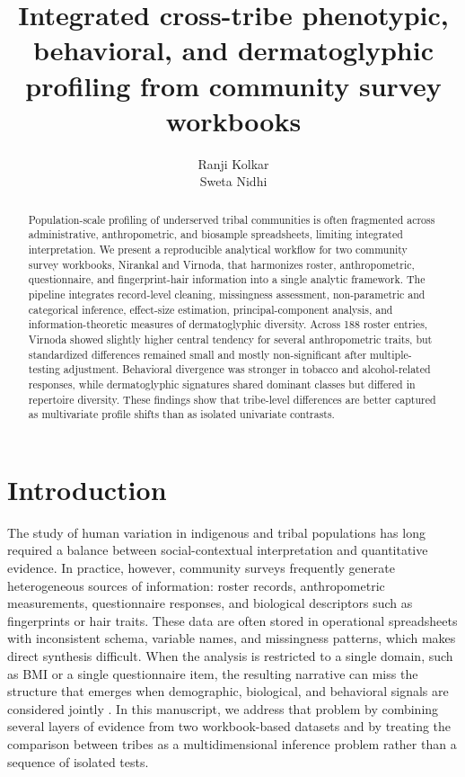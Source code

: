 \documentclass[11pt]{article}
\title{Integrated cross-tribe phenotypic, behavioral, and dermatoglyphic profiling from community survey workbooks}
\author{Ranji Kolkar\\Sweta Nidhi}
\date{}
\begin{document}
\maketitle

\begin{abstract}
Population-scale profiling of underserved tribal communities is often fragmented across administrative, anthropometric, and biosample spreadsheets, limiting integrated interpretation. We present a reproducible analytical workflow for two community survey workbooks, Nirankal and Virnoda, that harmonizes roster, anthropometric, questionnaire, and fingerprint-hair information into a single analytic framework. The pipeline integrates record-level cleaning, missingness assessment, non-parametric and categorical inference, effect-size estimation, principal-component analysis, and information-theoretic measures of dermatoglyphic diversity. Across 188 roster entries, Virnoda showed slightly higher central tendency for several anthropometric traits, but standardized differences remained small and mostly non-significant after multiple-testing adjustment. Behavioral divergence was stronger in tobacco and alcohol-related responses, while dermatoglyphic signatures shared dominant classes but differed in repertoire diversity. These findings show that tribe-level differences are better captured as multivariate profile shifts than as isolated univariate contrasts.
\end{abstract}

\section{Introduction}
The study of human variation in indigenous and tribal populations has long required a balance between social-contextual interpretation and quantitative evidence. In practice, however, community surveys frequently generate heterogeneous sources of information: roster records, anthropometric measurements, questionnaire responses, and biological descriptors such as fingerprints or hair traits. These data are often stored in operational spreadsheets with inconsistent schema, variable names, and missingness patterns, which makes direct synthesis difficult. When the analysis is restricted to a single domain, such as BMI or a single questionnaire item, the resulting narrative can miss the structure that emerges when demographic, biological, and behavioral signals are considered jointly \cite{who1995,who2000,rubin1976,little2002,vanbuuren2018}. In this manuscript, we address that problem by combining several layers of evidence from two workbook-based datasets and by treating the comparison between tribes as a multidimensional inference problem rather than a sequence of isolated tests.
\end{document}
